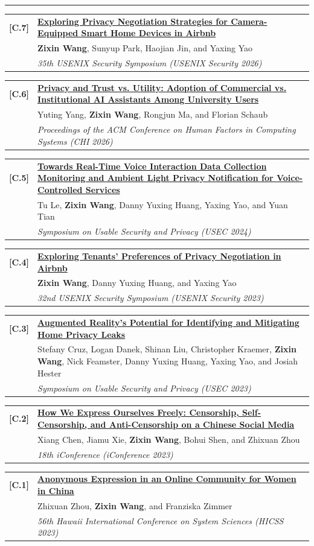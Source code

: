 \documentclass[10pt,letterpaper]{article}
\makeatletter
\newcommand{\cvsection}[1]{%
  \Needspace{5\baselineskip}%
  \vspace{0.90em}%
  {\large\textls[55]{\MakeUppercase{#1}}}\par
  \vspace{0.10em}\hrule\vspace{0.45em}
}
\newcommand{\publication}[4]{%
  \Needspace{4.2\baselineskip}%
  \begin{tabularx}{\textwidth}{@{}>{\bfseries}p{0.36in}@{\hspace{0.07in}}X@{}}
    [#1] & \textbf{#2} \\
         & #3 \\
         & \textit{#4}
  \end{tabularx}\par\vspace{0.34em}
}
\makeatother
\begin{document}
\cvsection{Conference Papers}

\publication{C.7}
  {\href{https://www.usenix.org/conference/usenixsecurity26/presentation/wang-zixin}
  {Exploring Privacy Negotiation Strategies for Camera-Equipped Smart Home
  Devices in Airbnb}}
  {\textbf{Zixin Wang}, Sunyup Park, Haojian Jin, and Yaxing Yao}
  {35th USENIX Security Symposium (USENIX Security 2026)}

\publication{C.6}
  {\href{https://dl.acm.org/doi/10.1145/3772318.3790881}
  {Privacy and Trust vs. Utility: Adoption of Commercial vs. Institutional AI
  Assistants Among University Users}}
  {Yuting Yang, \textbf{Zixin Wang}, Rongjun Ma, and Florian Schaub}
  {Proceedings of the ACM Conference on Human Factors in Computing Systems
  (CHI 2026)}

\publication{C.5}
  {\href{https://www.ndss-symposium.org/wp-content/uploads/usec2024-39-paper.pdf}
  {Towards Real-Time Voice Interaction Data Collection Monitoring and Ambient
  Light Privacy Notification for Voice-Controlled Services}}
  {Tu Le, \textbf{Zixin Wang}, Danny Yuxing Huang, Yaxing Yao, and Yuan Tian}
  {Symposium on Usable Security and Privacy (USEC 2024)}

\publication{C.4}
  {\href{https://www.usenix.org/system/files/usenixsecurity23-wang-zixin.pdf}
  {Exploring Tenants' Preferences of Privacy Negotiation in Airbnb}}
  {\textbf{Zixin Wang}, Danny Yuxing Huang, and Yaxing Yao}
  {32nd USENIX Security Symposium (USENIX Security 2023)}

\publication{C.3}
  {\href{https://www.ndss-symposium.org/wp-content/uploads/2023/02/usec2023-238930-paper.pdf}
  {Augmented Reality's Potential for Identifying and Mitigating Home Privacy
  Leaks}}
  {Stefany Cruz, Logan Danek, Shinan Liu, Christopher Kraemer, \textbf{Zixin
  Wang}, Nick Feamster, Danny Yuxing Huang, Yaxing Yao, and Josiah Hester}
  {Symposium on Usable Security and Privacy (USEC 2023)}

\publication{C.2}
  {\href{https://dl.acm.org/doi/abs/10.1007/978-3-031-28032-0_8}
  {How We Express Ourselves Freely: Censorship, Self-Censorship, and
  Anti-Censorship on a Chinese Social Media}}
  {Xiang Chen, Jiamu Xie, \textbf{Zixin Wang}, Bohui Shen, and Zhixuan Zhou}
  {18th iConference (iConference 2023)}

\publication{C.1}
  {\href{https://scholarspace.manoa.hawaii.edu/server/api/core/bitstreams/96927829-8fcf-4e4a-92d5-07e56871e0ca/content}
  {Anonymous Expression in an Online Community for Women in China}}
  {Zhixuan Zhou, \textbf{Zixin Wang}, and Franziska Zimmer}
  {56th Hawaii International Conference on System Sciences (HICSS 2023)}
\end{document}
